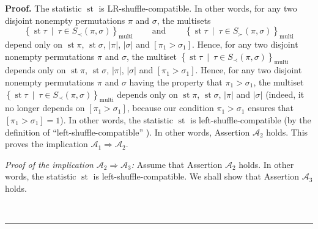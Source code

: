 \documentclass[numbers=enddot,12pt,final,onecolumn,notitlepage]{scrartcl}%
\theoremstyle{definition}
\newenvironment{proof}[1][Proof]{\noindent\textbf{#1.} }{\ \rule{0.5em}{0.5em}}
\newenvironment{verlong}{}{}
\begin{document}
\begin{verlong}
\begin{proof}
The statistic $\operatorname{st}$ is LR-shuffle-compatible. In other words,
for any two disjoint nonempty permutations $\pi$ and $\sigma$, the multisets%
\[
\left\{  \operatorname{st} \tau   \ \mid\ \tau\in S_{\prec
}\left(  \pi,\sigma\right)  \right\}  _{\operatorname*{multi}}%
\ \ \ \ \ \ \ \ \ \ \text{and}
\ \ \ \ \ \ \ \ \ \ \left\{  \operatorname{st} \tau
\ \mid\ \tau\in S_{\succ}\left(  \pi,\sigma\right)
\right\}  _{\operatorname*{multi}}%
\]
depend only on $\operatorname{st} \pi   $, $\operatorname{st} \sigma$,
$\left\vert \pi\right\vert $, $\left\vert \sigma\right\vert $ and
$\left[  \pi_{1}>\sigma_{1}\right]  $. Hence, for any
two disjoint nonempty permutations $\pi$ and $\sigma$, the multiset $\left\{
\operatorname{st} \tau   \ \mid\ \tau\in S_{\prec}\left(
\pi,\sigma\right)  \right\}  _{\operatorname*{multi}}$ depends only on
$\operatorname{st} \pi$, $\operatorname{st} \sigma$,
$\left\vert \pi\right\vert $, $\left\vert \sigma\right\vert$ and
$\left[  \pi_{1}>\sigma_{1}\right]  $. Hence, for any two disjoint
nonempty permutations $\pi$ and $\sigma$ having the property that $\pi
_{1}>\sigma_{1}$, the multiset \newline$\left\{  \operatorname{st}
\tau \ \mid\ \tau\in S_{\prec}\left(  \pi,\sigma\right)  \right\}
_{\operatorname*{multi}}$ depends only on $\operatorname{st} \pi$,
$\operatorname{st} \sigma$, $\left\vert \pi\right\vert $ and
$\left\vert \sigma\right\vert $ (indeed, it no longer
depends on $\left[  \pi_{1}>\sigma_{1}\right]  $, because our condition
$\pi_{1}>\sigma_{1}$ ensures that $\left[  \pi_{1}>\sigma_{1}\right]  =1$). In
other words, the statistic $\operatorname{st}$ is left-shuffle-compatible (by
the definition of \textquotedblleft left-shuffle-compatible\textquotedblright%
). In other words, Assertion $\mathcal{A}_{2}$ holds. This proves the
implication $\mathcal{A}_{1}\Longrightarrow\mathcal{A}_{2}$.

\textit{Proof of the implication }$\mathcal{A}_{2}\Longrightarrow
\mathcal{A}_{3}$\textit{:} Assume that Assertion $\mathcal{A}_{2}$ holds. In
other words, the statistic $\operatorname{st}$ is left-shuffle-compatible. We
shall show that Assertion $\mathcal{A}_{3}$ holds.


\end{proof}
\end{verlong}
\end{document}
